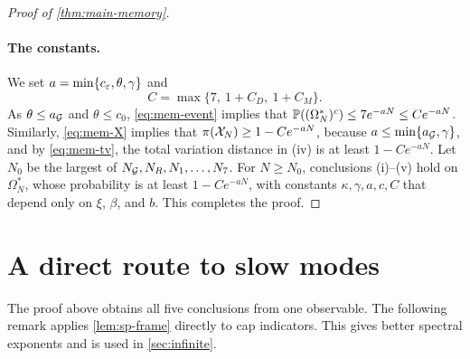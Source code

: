 \begin{proof}[Proof of \cref{thm:main-memory}]
\paragraph{The constants.} We set $a=\min\{c_\varepsilon,\theta,\gamma\}$ and
\begin{equation}\label{eq:mem-C}
C=\max\{7,\ 1+C_D,\ 1+C_M\}.
\end{equation}
As $\theta\le a_\mathcal G$ and $\theta\le c_0$, \eqref{eq:mem-event} implies that $\mathbb P((\Omega^*_N)^c)\le7e^{-aN}\le Ce^{-aN}$. Similarly, \eqref{eq:mem-X} implies that $\pi(\mathcal X_N)\ge1-Ce^{-aN}$, because $a\le\min\{a_\mathcal G,\gamma\}$, and by \eqref{eq:mem-tv}, the total variation distance in (iv) is at least $1-Ce^{-aN}$. Let $N_0$ be the largest of $N_\mathcal G,N_R,N_1,\dots,N_7$. For $N\ge N_0$, conclusions (i)--(v) hold on $\Omega^*_N$, whose probability is at least $1-Ce^{-aN}$, with constants $\kappa,\gamma,a,c,C$ that depend only on $\xi$, $\beta$, and $b$. This completes the proof.
\end{proof}

\section{A direct route to slow modes}\label{sec:mem-routes}

The proof above obtains all five conclusions from one observable. The following remark applies \cref{lem:sp-frame} directly to cap indicators. This gives better spectral exponents and is used in \cref{sec:infinite}.

